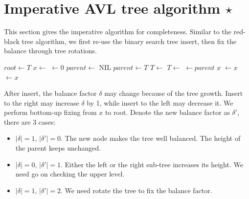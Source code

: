 \documentclass[b5paper]{article}
\begin{document}
\begin{Exercise}
\end{Exercise}

\section{Imperative AVL tree algorithm $\star$}

This section gives the imperative algorithm for completeness. Similar to the red-black tree algorithm, we first re-use the binary search tree insert, then fix the balance through tree rotations.

\begin{algorithmic}[1]
  \State $root \gets T$
  \State $x \gets$ 
  \State {} $\gets 0$
  \State $parent \gets$ NIL
    \State $parent \gets T$
      \State $T \gets $ 
    \Else
      \State $T \gets $ 
    \EndIf
  \EndWhile
  \State {} $\gets parent$
   
    \State \Return $x$
    \State {} $\gets x$
  \Else
    \State {} $\gets x$
  \EndIf
  \State \Return {}
\EndFunction
\end{algorithmic}

After insert, the balance factor $\delta$ may change because of the tree growth. Insert to the right may increase $\delta$ by 1, while insert to the left may decrease it. We perform bottom-up fixing from $x$ to root. Denote the new balance factor as $\delta'$, there are 3 cases:

\begin{itemize}
\item $|\delta| = 1$, $|\delta'| = 0$. The new node makes the tree well balanced. The height of the parent keeps unchanged.

\item $|\delta| = 0$, $|\delta'| = 1$. Either the left or the right sub-tree increases its height. We need go on checking the upper level.

\item $|\delta| = 1$, $|\delta'| = 2$. We need rotate the tree to fix the balance factor.
\end{itemize}
\end{document}
